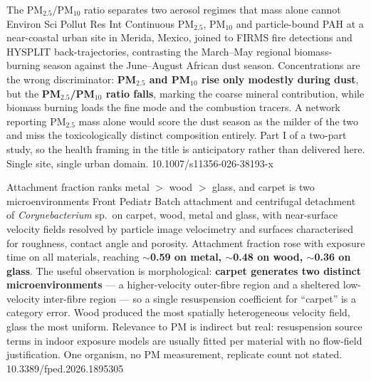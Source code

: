 \documentclass[10pt]{article}
\begin{document}
{The PM$_{2.5}$/PM$_{10}$ ratio separates two aerosol regimes that mass alone cannot}
{Environ Sci Pollut Res Int}
{Continuous PM$_{2.5}$, PM$_{10}$ and particle-bound PAH at a near-coastal urban site in
Merida, Mexico, joined to FIRMS fire detections and HYSPLIT back-trajectories, contrasting
the March--May regional biomass-burning season against the June--August African dust
season. Concentrations are the wrong discriminator: \textbf{PM$_{2.5}$ and PM$_{10}$ rise
only modestly during dust}, but the \textbf{PM$_{2.5}$/PM$_{10}$ ratio falls}, marking the
coarse mineral contribution, while biomass burning loads the fine mode and the combustion
tracers. A network reporting PM$_{2.5}$ mass alone would score the dust season as the
milder of the two and miss the toxicologically distinct composition entirely. Part I of a
two-part study, so the health framing in the title is anticipatory rather than delivered
here. Single site, single urban domain.}
{10.1007/s11356-026-38193-x}

{Attachment fraction ranks metal $>$ wood $>$ glass, and carpet is two microenvironments}
{Front Pediatr}
{Batch attachment and centrifugal detachment of \textit{Corynebacterium} sp.\ on carpet,
wood, metal and glass, with near-surface velocity fields resolved by particle image
velocimetry and surfaces characterised for roughness, contact angle and porosity.
Attachment fraction rose with exposure time on all materials, reaching \textbf{$\sim$0.59
on metal, $\sim$0.48 on wood, $\sim$0.36 on glass}. The useful observation is
morphological: \textbf{carpet generates two distinct microenvironments} --- a
higher-velocity outer-fibre region and a sheltered low-velocity inter-fibre region --- so a
single resuspension coefficient for ``carpet'' is a category error. Wood produced the most
spatially heterogeneous velocity field, glass the most uniform. Relevance to PM is
indirect but real: resuspension source terms in indoor exposure models are usually fitted
per material with no flow-field justification. One organism, no PM measurement, replicate
count not stated.}
{10.3389/fped.2026.1895305}

\end{document}
